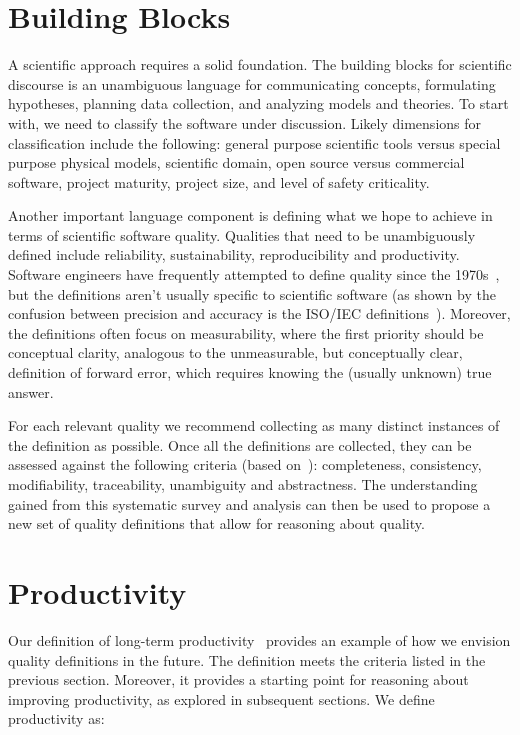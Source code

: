 \documentclass[sigconf, authorversion, nonacm]{acmart}
\begin{document}
\section{Building Blocks}

A scientific approach requires a solid foundation.  The building blocks for
scientific discourse is an unambiguous language for communicating concepts,
formulating hypotheses, planning data collection, and analyzing models and
theories.  To start with, we need to classify the software under discussion.
Likely dimensions for classification include the following: general purpose
scientific tools versus special purpose physical models, scientific domain, open
source versus commercial software, project maturity, project size, and level of
safety criticality.

Another important language component is defining what we hope to achieve in
terms of scientific software quality. Qualities that need to be unambiguously
defined include reliability, sustainability, reproducibility and productivity.
Software engineers have frequently attempted to define quality since the
1970s~\cite{McCallEtAl1977}, but the definitions aren't usually specific to
scientific software (as shown by the confusion between precision and accuracy is
the ISO/IEC definitions~\cite{ISO9126}). Moreover, the definitions often focus
on measurability, where the first priority should be conceptual clarity,
analogous to the unmeasurable, but conceptually clear, definition of forward
error, which requires knowing the (usually unknown) true answer.

For each relevant quality we recommend collecting as many distinct instances of
the definition as possible.  Once all the definitions are collected, they can be
assessed against the following criteria (based on~\citet{IEEE1998}):
completeness, consistency, modifiability, traceability, unambiguity and
abstractness. The understanding gained from this systematic survey and analysis
can then be used to propose a new set of quality definitions that allow for
reasoning about quality.

\section{Productivity}

Our definition of long-term productivity~\cite{SmithAndCarette2020arXiv}
provides an example of how we envision quality definitions in the future.  The
definition meets the criteria listed in the previous section.  Moreover, it
provides a starting point for reasoning about improving productivity, as
explored in subsequent sections.  We define productivity as:
\end{document}
